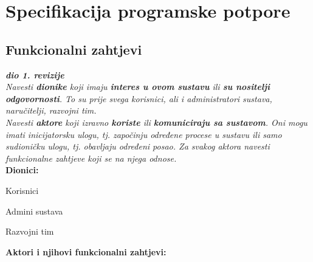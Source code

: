 \chapter{Specifikacija programske potpore}
		
	\section{Funkcionalni zahtjevi}
			
			\textbf{\textit{dio 1. revizije}}\\
			
			\textit{Navesti \textbf{dionike} koji imaju \textbf{interes u ovom sustavu} ili  \textbf{su nositelji odgovornosti}. To su prije svega korisnici, ali i administratori sustava, naručitelji, razvojni tim.}\\
				
			\textit{Navesti \textbf{aktore} koji izravno \textbf{koriste} ili \textbf{komuniciraju sa sustavom}. Oni mogu imati inicijatorsku ulogu, tj. započinju određene procese u sustavu ili samo sudioničku ulogu, tj. obavljaju određeni posao. Za svakog aktora navesti funkcionalne zahtjeve koji se na njega odnose.}\\
			
			
			\noindent \textbf{Dionici:}
			
			\begin{packed_enum}
				
				\item Korisnici
				\item Admini sustava				
				\item Razvojni tim
				
			\end{packed_enum}
			
			\noindent \textbf{Aktori i njihovi funkcionalni zahtjevi:}
			
